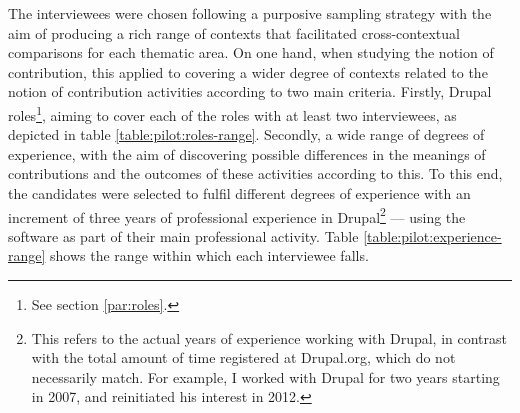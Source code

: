 The interviewees were chosen following a purposive sampling strategy with the aim of producing a rich range of contexts that facilitated cross-contextual comparisons \parencite[123-127]{mason2002qualitative} for each thematic area. On one hand, when studying the notion of contribution, this applied to covering a wider degree of contexts related to the notion of contribution activities according to two main criteria. Firstly, Drupal roles\footnote{See section \ref{par:roles}.}, aiming to cover each of the roles with at least two interviewees, as depicted in table \ref{table:pilot:roles-range}. Secondly, a wide range of degrees of experience, with the aim of discovering possible differences in the meanings of contributions and the outcomes of these activities according to this. To this end, the candidates were selected to fulfil different degrees of experience with an increment of three years of professional experience in Drupal\footnote{This refers to the actual years of experience working with Drupal, in contrast with the total amount of time registered at Drupal.org, which do not necessarily match. For example, I worked with Drupal for two years starting in 2007, and reinitiated his interest in 2012.}  --- using the software as part of their main professional activity. Table \ref{table:pilot:experience-range} shows the range within which each interviewee falls.

